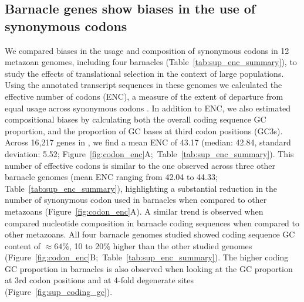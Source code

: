 \subsection*{Barnacle genes show biases in the use of synonymous codons}

We compared biases in the usage and composition of synonymous codons in 12 metazoan
genomes, including four barnacles (Table~\ref{tab:sup_enc_summary}), to study the effects of
translational selection in the context of large populations.
Using the annotated transcript sequences in these genomes we calculated the effective number
of codons (ENC), a measure of the extent of departure from equal usage across synonymous
codons \citep{wright_effective_1990,sun_improved_2013}.
In addition to ENC, we also estimated compositional biases by calculating both the overall
coding sequence GC proportion, and the proportion of GC bases at third codon positions (GC3s).
Across 16{,}217 genes in \bgla{}, we find a mean ENC of 43.17 (median: 42.84, standard
deviation: 5.52; Figure~\ref{fig:codon_enc}A;~Table~\ref{tab:sup_enc_summary}).
This number of effective codons is similar to the one observed across three other barnacle
genomes (mean ENC ranging from 42.04 to 44.33; Table~\ref{tab:sup_enc_summary}), highlighting a
substantial reduction in the number of synonymous codon used in barnacles when compared to other
metazoans (Figure~\ref{fig:codon_enc}A).
A similar trend is observed when compared nucleotide composition in barnacle coding sequences
 when compared to other metazoans.
All four barnacle genomes studied showed coding sequence GC content of $\approx64\%$, 10 to 20\%
higher than the other studied genomes (Figure~\ref{fig:codon_enc}B;~Table~\ref{tab:sup_enc_summary}).
The higher coding GC proportion in barnacles is also observed when looking at the GC proportion
at 3rd codon positions and at 4-fold degenerate sites (Figure~\ref{fig:sup_coding_gc}).
\vspace{0.1cm}

